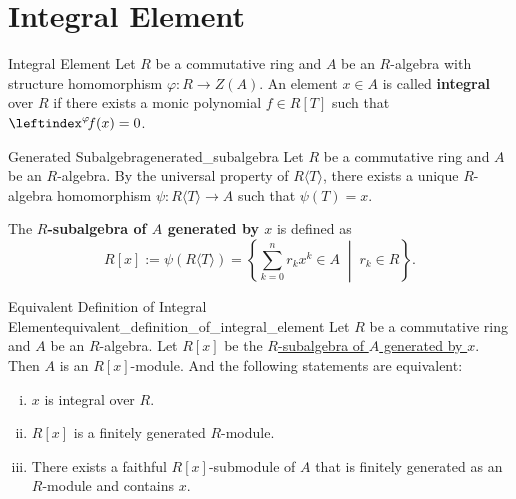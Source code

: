 \section{Integral Element}

\begin{definition}{Integral Element}{}
    Let $R$ be a commutative ring and $A$ be an $R$-algebra with structure homomorphism $\varphi:R\to Z(A)$. An element $x\in A$ is called \textbf{integral} over $R$ if there exists a monic polynomial $f\in R[T]$ such that $\leftindex^{\varphi}\!f(x)=0$.
\end{definition}


\begin{definition}{Generated Subalgebra}{generated_subalgebra}
    Let $R$ be a commutative ring and $A$ be an $R$-algebra. By the universal property of $R\langle T\rangle$, there exists a unique $R$-algebra homomorphism $\psi:R\langle T\rangle\to A$ such that 
    $\psi(T)=x$.
    \begin{center}
    \end{center}
    The \textbf{$R$-subalgebra of $A$ generated by $x$} is defined as 
    \[
    R[x]:=\psi\left(R\langle T\rangle\right)=\left\{\sum_{k=0}^n r_k x^k \in A\;\middle|\; r_k\in R\right\}.
    \]
\end{definition}

\begin{proposition}{Equivalent Definition of Integral Element}{equivalent_definition_of_integral_element}
    Let $R$ be a commutative ring and $A$ be an $R$-algebra. Let $R[x]$ be the \hyperref[th:generated_subalgebra]{$R$-subalgebra of $A$ generated by $x$}. Then $A$ is an $R[x]$-module. And the following statements are equivalent:
    \begin{enumerate}[(i)]
        \item $x$ is integral over $R$.
        \item $R[x]$ is a finitely generated $R$-module.
        \item There exists a faithful $R[x]$-submodule of $A$ that is finitely generated as an $R$-module and contains $x$.
    \end{enumerate}
\end{proposition}

